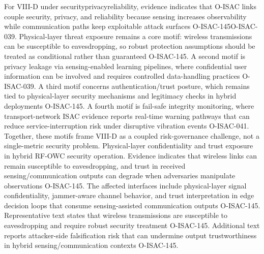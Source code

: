 {}For VIII-D under security\markdownRendererUnderscore{}privacy\markdownRendererUnderscore{}reliability, evidence indicates that O-ISAC links couple security, privacy, and reliability because sensing increases observability while communication paths keep exploitable attack surfaces O-ISAC-145O-ISAC-039. Physical-layer threat exposure remains a core motif: wireless transmissions can be susceptible to eavesdropping, so robust protection assumptions should be treated as conditional rather than guaranteed O-ISAC-145. A second motif is privacy leakage via sensing-enabled learning pipelines, where confidential user information can be involved and requires controlled data-handling practices O-ISAC-039. A third motif concerns authentication/trust posture, which remains tied to physical-layer security mechanisms and legitimacy checks in hybrid deployments O-ISAC-145. A fourth motif is fail-safe integrity monitoring, where transport-network ISAC evidence reports real-time warning pathways that can reduce service-interruption risk under disruptive vibration events O-ISAC-041. Together, these motifs frame VIII-D as a coupled risk-governance challenge, not a single-metric security problem.\markdownRendererInterblockSeparator
{}
\markdownRendererSectionEnd \markdownRendererSectionBegin
{}\markdownRendererInterblockSeparator
{}\markdownRendererOlBegin
{} Physical-layer confidentiality and trust exposure in hybrid RF-OWC security operation.\markdownRendererOlItemEnd 
{} Evidence indicates that wireless links can remain susceptible to eavesdropping, and trust in received sensing/communication outputs can degrade when adversaries manipulate observations O-ISAC-145.\markdownRendererOlItemEnd 
{} The affected interfaces include physical-layer signal confidentiality, jammer-aware channel behavior, and trust interpretation in edge decision loops that consume sensing-assisted communication outputs O-ISAC-145.\markdownRendererOlItemEnd 
{} Representative text states that wireless transmissions are susceptible to eavesdropping and require robust security treatment O-ISAC-145. Additional text reports attacker-side falsification risk that can undermine output trustworthiness in hybrid sensing/communication contexts O-ISAC-145.\markdownRendererOlItemEnd 
